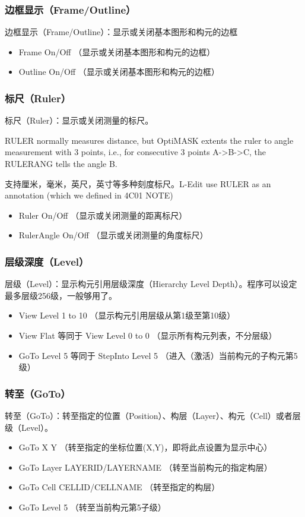\subsubsection{边框显示（Frame/Outline）} \label{SectCmdViewFrame}
边框显示（Frame/Outline）：显示或关闭基本图形和构元的边框
\begin{itemize}
	\item Frame On/Off   （显示或关闭基本图形和构元的边框）
	\item Outline On/Off （显示或关闭基本图形和构元的边框）
\end{itemize}

\subsubsection{标尺（Ruler）} \label{SectCmdViewRuler}
标尺（Ruler）：显示或关闭测量的标尺。

RULER normally measures distance, but OptiMASK extents the ruler to angle measurement with 3 points, i.e., for consecutive 3 points A->B->C, the RULERANG tells the angle B.

支持厘米，毫米，英尺，英寸等多种刻度标尺。L-Edit use RULER as an annotation (which we defined in 4C01 NOTE)

\begin{itemize}
	\item Ruler On/Off   （显示或关闭测量的距离标尺）
	\item RulerAngle On/Off  （显示或关闭测量的角度标尺）
\end{itemize}

\subsubsection{层级深度（Level）} \label{SectCmdViewLevel}
层级（Level）：显示构元引用层级深度（Hierarchy Level Depth）。程序可以设定最多层级256级，一般够用了。
\begin{itemize}
	\item View Level 1 to 10   （显示构元引用层级从第1级至第10级）
	\item View Flat 等同于 View Level 0 to 0  （显示所有构元列表，不分层级）
	\item GoTo Level 5 等同于 StepInto Level 5  （进入（激活）当前构元的子构元第5级）
\end{itemize}

\subsubsection{转至（GoTo）} \label{SectCmdViewGoTo}
转至（GoTo）：转至指定的位置（Position）、构层（Layer）、构元（Cell）或者层级（Level）。
\begin{itemize}
	\item GoTo X Y   （转至指定的坐标位置(X,Y)，即将此点设置为显示中心）
	\item GoTo Layer LAYERID/LAYERNAME （转至当前构元的指定构层）
	\item GoTo Cell  CELLID/CELLNAME （转至指定的构层）
	\item GoTo Level 5 （转至当前构元第5子级）
\end{itemize}

